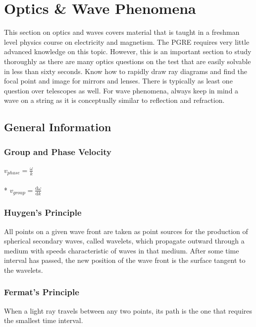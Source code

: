 \section{Optics \& Wave Phenomena}
This section on optics and waves covers material that is taught in a freshman level physics course on electricity and magnetism.
The PGRE requires very little advanced knowledge on this topic.
However, this is an important section to study thoroughly as there are many optics questions on the test that are easily solvable in less than sixty seconds.
Know how to rapidly draw ray diagrams and find the focal point and image for mirrors and lenses.
There is typically as least one question over telescopes as well.
For wave phenomena, always keep in mind a wave on a string as it is conceptually similar to reflection and refraction.

\subsection{General Information}

\subsubsection{Group and Phase Velocity}
\(\displaystyle v_{phase}=\frac{\omega}{k}\)\\\\*
\(\displaystyle v_{group}=\frac{\mathrm{d}\omega}{\mathrm{d}k}\)

\subsubsection{Huygen's Principle}
All points on a given wave front are taken as point sources for the production of spherical secondary waves, called wavelets, which propagate outward through a medium with speeds characteristic of waves in that medium.
After some time interval has passed, the new position of the wave front is the surface tangent to the wavelets.

\subsubsection{Fermat's Principle}
When a light ray travels between any two points, its path is the one that requires the smallest time interval.

